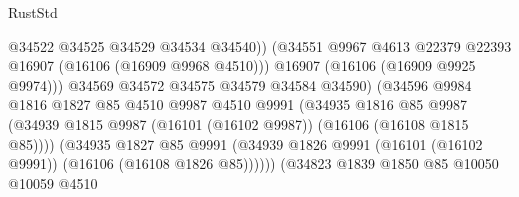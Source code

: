 \begin{lexlean}{RustStd}
\begin{coremodule}
                                            @34522
                                            @34525
                                            @34529
                                            @34534
                                            @34540))
                                        (@34551
                                          @9967
                                          @4613
                                          @22379
                                          @22393
                                          @16907
                                          (@16106 (@16909 @9968 @4510)))
                                        @16907
                                        (@16106 (@16909 @9925 @9974)))
                                      @34569
                                      @34572
                                      @34575
                                      @34579
                                      @34584
                                      @34590)
                                    (@34596
                                      @9984
                                      @1816
                                      @1827
                                      @85
                                      @4510
                                      @9987
                                      @4510
                                      @9991
                                      (@34935
                                        @1816
                                        @85
                                        @9987
                                        (@34939
                                          @1815
                                          @9987
                                          (@16101 (@16102 @9987))
                                          (@16106 (@16108 @1815 @85))))
                                      (@34935
                                        @1827
                                        @85
                                        @9991
                                        (@34939
                                          @1826
                                          @9991
                                          (@16101 (@16102 @9991))
                                          (@16106 (@16108 @1826 @85))))))
                                  (@34823
                                    @1839
                                    @1850
                                    @85
                                    @10050
                                    @10059
                                    @4510

\end{coremodule}
\end{lexlean}
